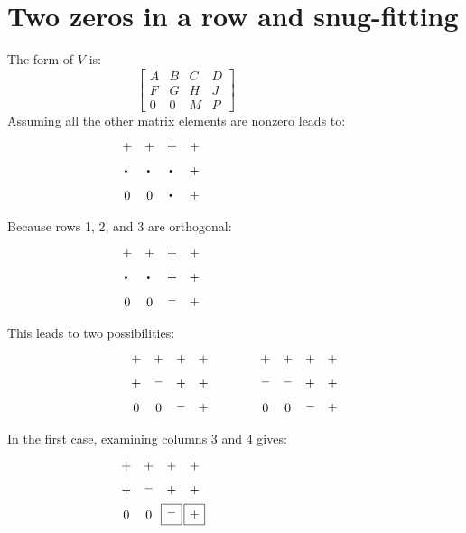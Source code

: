 \section*{Two zeros in a row and snug-fitting}
\label{refpage22}

The form of $V$ is:
\begin{equation*}
\begin{bmatrix}
A & B & C & D \\
F & G & H & J \\
0 & 0 & M & P
\end{bmatrix}
~~~~~~~~~~~~~~~~~~~~~~~~~~~~~~~~~~~
\end{equation*}
Assuming all the other matrix elements are nonzero leads to:
\begin{equation*}
\myarrset
\begin{array}{cccc}
\ndcp & \ndcp & \ndcp & \ndcp \\
\ndcd & \ndcd & \ndsd & \ndcp \\
\ndsz & \ndcz & \ndcd & \ndsp
\end{array}
~~~~~~~~~~~~~~~~~~~~~~~~~~~~~~~~~~~
\end{equation*}
Because rows 1, 2, and 3 are orthogonal:
\begin{equation*}
\myarrset
\begin{array}{cccc}
\ndcp & \ndcp & \ndcp & \ndcp \\
\ndcd & \ndcd & \ndsp & \ndcp \\
\ndsz & \ndcz & \ndcm & \ndsp
\end{array}
~~~~~~~~~~~~~~~~~~~~~~~~~~~~~~~~~~~
\end{equation*}
This leads to two possibilities:
\begin{equation*}
\myarrset
\begin{array}{ccccccccc}
\ndcp & \ndcp & \ndcp & \ndcp & ~~~~~~~~~ & \ndcp & \ndcp & \ndcp & \ndcp \\
\ndcp & \ndcm & \ndcp & \ndcp & ~~~~~~~~~ & \ndcm & \ndcm & \ndcp & \ndcp \\
\ndcz & \ndcz & \ndcm & \ndcp & ~~~~~~~~~ & \ndcz & \ndcz & \ndcm & \ndcp
\end{array}
\end{equation*}
In the first case, examining columns 3 and 4 gives:
\begin{equation*}
\myarrset
\begin{array}{ccccccccc}
\ndcp & \ndcp & \ndcp & \ndcp \\
\ndcp & \ndcm & \ndcp & \ndcp \\
\ndcz & \ndcz & \dsm  & \dsp
\end{array}
~~~~~~~~~~~~~~~~~~~~~~~~~~~~~~~~~~~
\end{equation*}

